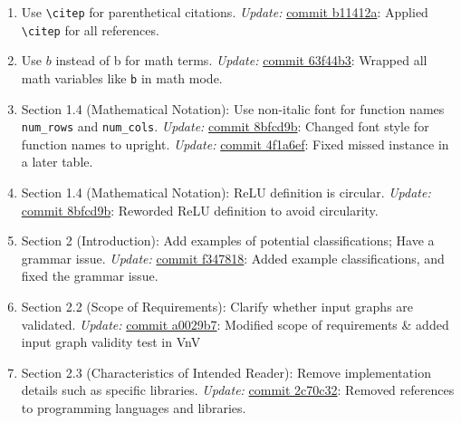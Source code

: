 \documentclass{article}
\begin{document}
\begin{enumerate}
    \item Use \texttt{\textbackslash citep} for parenthetical citations.  
    \newline \textit{Update:} \href{https://github.com/Yuanqi-X/Re-ProtGNN/commit/b11412a}{commit b11412a}: Applied \texttt{\textbackslash citep} for all references.

    \item Use $b$ instead of b for math terms.  
    \newline \textit{Update:} \href{https://github.com/Yuanqi-X/Re-ProtGNN/commit/63f44b3}{commit 63f44b3}: Wrapped all math variables like \texttt{b} in math mode.

    \item Section 1.4 (Mathematical Notation): Use non-italic font for function names \texttt{num\_rows} and \texttt{num\_cols}.  
    \newline \textit{Update:} \href{https://github.com/Yuanqi-X/Re-ProtGNN/commit/8bfcd9b}{commit 8bfcd9b}: Changed font style for function names to upright.  
    \newline \textit{Update:} \href{https://github.com/Yuanqi-X/Re-ProtGNN/commit/4f1a6ef}{commit 4f1a6ef}: Fixed missed instance in a later table.

    \item Section 1.4 (Mathematical Notation): ReLU definition is circular.  
    \newline \textit{Update:} \href{https://github.com/Yuanqi-X/Re-ProtGNN/commit/8bfcd9b}{commit 8bfcd9b}: Reworded ReLU definition to avoid circularity.

    \item Section 2 (Introduction): Add examples of potential classifications; Have a grammar issue.  
    \newline \textit{Update:} \href{https://github.com/Yuanqi-X/Re-ProtGNN/commit/f347818}{commit f347818}: Added example classifications, and fixed the grammar issue.

    \item Section 2.2 (Scope of Requirements): Clarify whether input graphs are validated.  
    \newline \textit{Update:} \href{https://github.com/Yuanqi-X/Re-ProtGNN/commit/a0029b7}{commit a0029b7}: Modified scope of requirements \& added input graph validity test in VnV

    \item Section 2.3 (Characteristics of Intended Reader): Remove implementation details such as specific libraries.  
    \newline \textit{Update:} \href{https://github.com/Yuanqi-X/Re-ProtGNN/commit/2c70c32}{commit 2c70c32}: Removed references to programming languages and libraries.


\end{enumerate}
\end{document}
